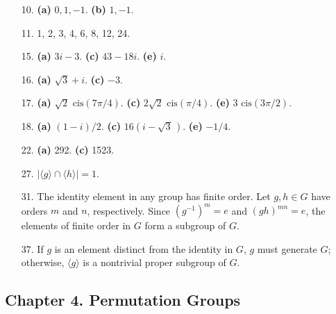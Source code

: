 {\begin{itemize}
\bf\item[10.]\rm
{\bf (a)} $0, 1, -1$.
{\bf (b)} $1, -1$.
 
\bf\item[11.]\rm
1, 2, 3, 4, 6, 8, 12, 24.
 
\bf\item[15.]\rm
{\bf (a)} $3i -3$.
{\bf (c)} $43 -18i$.
{\bf (e)} $i$.
 
\bf\item[16.]\rm
{\bf (a)} $\sqrt{3} + i$.
{\bf (c)} $-3$.
 
\bf\item[17.]\rm
{\bf (a)} $\sqrt{2} \mbox{ cis}( 7 \pi /4)$.
{\bf (c)} $2 \sqrt{2} \mbox{ cis}( \pi /4)$.
{\bf (e)} $3 \mbox{ cis}(3 \pi/2)$.
 
\bf\item[18.]\rm
{\bf (a)} $(1-i)/2$.
{\bf (c)} $16(i -\sqrt{3}\, )$.
{\bf (e)} $-1/4$.
 
\bf\item[22.]\rm
{\bf (a)} 292.
{\bf (c)} 1523.
 
 
\bf\item[27.]\rm
$|\langle g \rangle \cap \langle h \rangle| = 1$.
 
 
\bf\item[31.]\rm
The identity element in any group has finite order. Let $g, h \in G$
have orders $m$ and $n$, respectively. Since $(g^{-1})^m = e$ and
$(gh)^{mn} = e$, the elements of finite order in $G$ form a subgroup
of $G$.
 
\bf\item[37.]\rm
If $g$ is an element distinct from the identity in $G$, $g$ must
generate $G$; otherwise, $\langle g \rangle$ is a nontrivial proper
subgroup of $G$.
 
\end{itemize}
}
 
\subsection*{Chapter 4. Permutation Groups}
 
